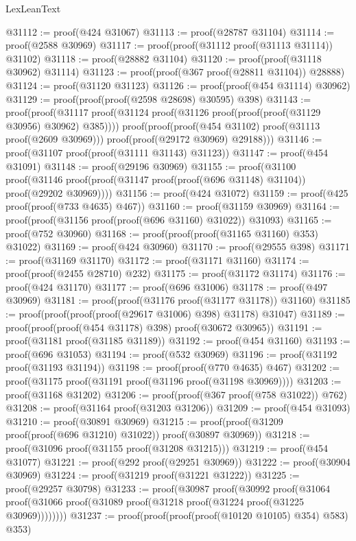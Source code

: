 \begin{lexlean}{LexLeanText}
\begin{coremodule}
@31112 := proof(@424 @31067)
@31113 := proof(@28787 @31104)
@31114 := proof(@2588 @30969)
@31117 := proof(proof(@31112 proof(@31113 @31114)) @31102)
@31118 := proof(@28882 @31104)
@31120 := proof(proof(@31118 @30962) @31114)
@31123 := proof(proof(@367 proof(@28811 @31104)) @28888)
@31124 := proof(@31120 @31123)
@31126 := proof(proof(@454 @31114) @30962)
@31129 := proof(proof(proof(@2598 @28698) @30595) @398)
@31143 := proof(proof(@31117
        proof(@31124 proof(@31126 proof(proof(proof(@31129 @30956) @30962) @385))))
      proof(proof(proof(@454 @31102) proof(@31113 proof(@2609 @30969)))
          proof(proof(@29172 @30969) @29188)))
@31146 := proof(@31107 proof(proof(@31111 @31143) @31123))
@31147 := proof(@454 @31091)
@31148 := proof(@29196 @30969)
@31155 := proof(@31100
      proof(@31146 proof(proof(@31147 proof(proof(@696 @31148) @31104)) proof(@29202 @30969))))
@31156 := proof(@424 @31072)
@31159 := proof(@425 proof(proof(@733 @4635) @467))
@31160 := proof(@31159 @30969)
@31164 := proof(proof(@31156 proof(proof(@696 @31160) @31022)) @31093)
@31165 := proof(@752 @30960)
@31168 := proof(proof(proof(@31165 @31160) @353) @31022)
@31169 := proof(@424 @30960)
@31170 := proof(@29555 @398)
@31171 := proof(@31169 @31170)
@31172 := proof(@31171 @31160)
@31174 := proof(proof(@2455 @28710) @232)
@31175 := proof(@31172 @31174)
@31176 := proof(@424 @31170)
@31177 := proof(@696 @31006)
@31178 := proof(@497 @30969)
@31181 := proof(proof(@31176 proof(@31177 @31178)) @31160)
@31185 := proof(proof(proof(proof(@29617 @31006) @398) @31178) @31047)
@31189 := proof(proof(proof(@454 @31178) @398) proof(@30672 @30965))
@31191 := proof(@31181 proof(@31185 @31189))
@31192 := proof(@454 @31160)
@31193 := proof(@696 @31053)
@31194 := proof(@532 @30969)
@31196 := proof(@31192 proof(@31193 @31194))
@31198 := proof(proof(@770 @4635) @467)
@31202 := proof(@31175 proof(@31191 proof(@31196 proof(@31198 @30969))))
@31203 := proof(@31168 @31202)
@31206 := proof(proof(@367 proof(@758 @31022)) @762)
@31208 := proof(@31164 proof(@31203 @31206))
@31209 := proof(@454 @31093)
@31210 := proof(@30891 @30969)
@31215 := proof(proof(@31209 proof(proof(@696 @31210) @31022)) proof(@30897 @30969))
@31218 := proof(@31096 proof(@31155 proof(@31208 @31215)))
@31219 := proof(@454 @31077)
@31221 := proof(@292 proof(@29251 @30969))
@31222 := proof(@30904 @30969)
@31224 := proof(@31219 proof(@31221 @31222))
@31225 := proof(@29257 @30798)
@31233 := proof(@30987
      proof(@30992
          proof(@31064
              proof(@31066 proof(@31089 proof(@31218 proof(@31224 proof(@31225 @30969))))))))
@31237 := proof(proof(proof(proof(@10120 @10105) @354) @583) @353)

\end{coremodule}
\end{lexlean}
